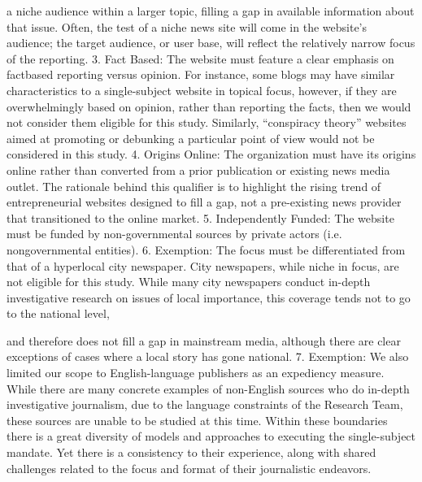a niche audience within a larger topic, filling a gap in available
information about that issue. Often, the test of a niche news site
will come in the website’s audience; the target audience, or user
base, will reflect the relatively narrow focus of the reporting.
3. Fact Based: The website must feature a clear emphasis on factbased
reporting versus opinion. For instance, some blogs may
have similar characteristics to a single-subject website in topical
focus, however, if they are overwhelmingly based on opinion,
rather than reporting the facts, then we would not consider
them eligible for this study. Similarly, ``conspiracy theory'' websites
aimed at promoting or debunking a particular point of view
would not be considered in this study.
4. Origins Online: The organization must have its origins online
rather than converted from a prior publication or existing news
media outlet. The rationale behind this qualifier is to highlight
the rising trend of entrepreneurial websites designed to fill a
gap, not a pre-existing news provider that transitioned to the
online market.
5. Independently Funded: The website must be funded by
non-governmental sources by private actors (i.e. nongovernmental
entities).
6. Exemption: The focus must be differentiated from that of a
hyperlocal city newspaper. City newspapers, while niche in
focus, are not eligible for this study. While many city newspapers
conduct in-depth investigative research on issues of local
importance, this coverage tends not to go to the national level,


and therefore does not fill a gap in mainstream media, although
there are clear exceptions of cases where a local story has
gone national.
7. Exemption: We also limited our scope to English-language publishers
as an expediency measure. While there are many concrete
examples of non-English sources who do in-depth investigative
journalism, due to the language constraints of the Research
Team, these sources are unable to be studied at this time.
Within these boundaries there is a great diversity of models and approaches
to executing the single-subject mandate. Yet there is a consistency to their
experience, along with shared challenges related to the focus and format of
their journalistic endeavors.


